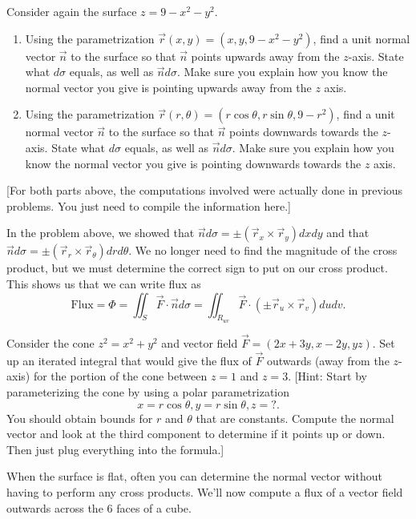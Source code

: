 \begin{problem}
Consider again the surface $z=9-x^2-y^2$. 
\begin{enumerate}
 \item Using the parametrization $\vec r(x,y) =(x,y,9-x^2-y^2)$, find a unit normal vector $\vec n$ to the surface so that $\vec n$ points upwards away from the $z$-axis. State what $d\sigma$ equals, as well as $\vec n d\sigma$. 
Make sure you explain how you know the normal vector you give is pointing upwards away from the $z$ axis.
 \item Using the parametrization $\vec r(r,\theta) =(r\cos \theta,r\sin\theta ,9-r^2)$, find a unit normal vector $\vec n$ to the surface so that $\vec n$ points downwards towards the $z$-axis. State what $d\sigma$ equals, as well as $\vec n d\sigma$.  
Make sure you explain how you know the normal vector you give is pointing downwards towards the $z$ axis.
\end{enumerate}
[For both parts above, the computations involved were actually done in previous problems. You just need to compile the information here.]
\end{problem}


In the problem above, we showed that $\vec n d\sigma = \pm(\vec r_x\times\vec r_y)dxdy$ and that $\vec n d\sigma = \pm(\vec r_r\times\vec r_\theta)drd\theta$.  We no longer need to find the magnitude of the cross product, but we must determine the correct sign to put on our cross product.  This shows us that we can write flux as 
$$\text{Flux}=\Phi 
= \iint_S \vec F\cdot \vec n d\sigma 
= \iint_{R_{uv}} \vec F\cdot (\pm \vec r_u\times \vec r_v) dudv
.$$



\begin{problem}
 Consider the cone $z^2=x^2+y^2$ and vector field $\vec F = (2x+3y, x-2y, yz)$. Set up an iterated integral that would give the flux of $\vec F$ outwards (away from the $z$-axis) for the portion of the cone between $z=1$ and $z=3$. [Hint: Start by  parameterizing the cone by using a polar parametrization $$x=r\cos\theta, y=r\sin\theta, z=?.$$ You should obtain bounds for $r$ and $\theta$ that are constants.  Compute the normal vector and look at the third component to determine if it points up or down.  Then just plug everything into the formula.]
\end{problem}




When the surface is flat, often you can determine the normal vector without having to perform any cross products.  We'll now compute a flux of a vector field outwards across the 6 faces of a cube. 


